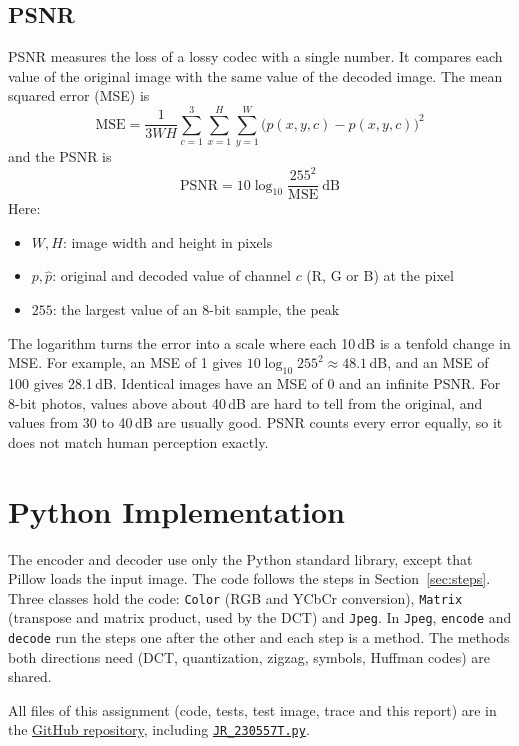 \documentclass[11pt,a4paper]{article}
\begin{document}
\subsection{PSNR}\label{sec:psnr}

PSNR measures the loss of a lossy codec with a single number. It compares each value of the original image with the same value of the decoded image. The mean squared error (MSE) is
\[
\mathrm{MSE}=\frac{1}{3WH}\sum_{c=1}^{3}\sum_{x=1}^{H}\sum_{y=1}^{W}\bigl(p(x,y,c)-\hat p(x,y,c)\bigr)^2
\]
and the PSNR is
\[
\mathrm{PSNR}=10\log_{10}\frac{255^2}{\mathrm{MSE}}\ \text{dB}
\]
Here:
\begin{itemize}
\item $W, H$: image width and height in pixels
\item $p, \hat p$: original and decoded value of channel $c$ (R, G or B) at the pixel
\item $255$: the largest value of an 8-bit sample, the peak
\end{itemize}
The logarithm turns the error into a scale where each 10\,dB is a tenfold change in MSE. For example, an MSE of 1 gives $10\log_{10}255^2\approx48.1$\,dB, and an MSE of 100 gives 28.1\,dB. Identical images have an MSE of 0 and an infinite PSNR. For 8-bit photos, values above about 40\,dB are hard to tell from the original, and values from 30 to 40\,dB are usually good. PSNR counts every error equally, so it does not match human perception exactly.

\section{Python Implementation}

The encoder and decoder use only the Python standard library, except that Pillow loads the input image. The code follows the steps in Section~\ref{sec:steps}. Three classes hold the code: \texttt{Color} (RGB and YCbCr conversion), \texttt{Matrix} (transpose and matrix product, used by the DCT) and \texttt{Jpeg}. In \texttt{Jpeg}, \texttt{encode} and \texttt{decode} run the steps one after the other and each step is a method. The methods both directions need (DCT, quantization, zigzag, symbols, Huffman codes) are shared.

All files of this assignment (code, tests, test image, trace and this report) are in the \href{https://github.com/sahithyandev/labs/tree/main/s5/image-processing/jpeg-compression}{GitHub repository}, including \href{https://github.com/sahithyandev/labs/tree/main/s5/image-processing/jpeg-compression/JR_230557T.py}{\texttt{JR\_230557T.py}}.
\end{document}
